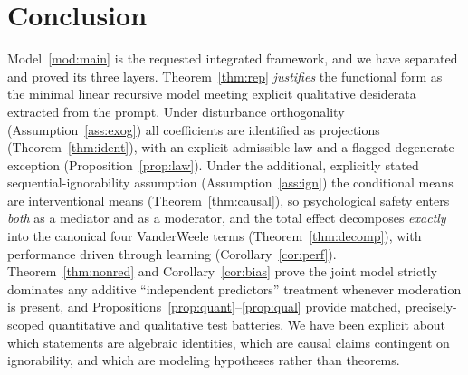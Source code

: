 \documentclass{amsart}
\theoremstyle{definition}
\theoremstyle{plain}
\begin{document}
\section{Conclusion}

Model~\ref{mod:main} is the requested integrated framework, and we have separated and proved
its three layers. Theorem~\ref{thm:rep} \emph{justifies} the functional form as the minimal
linear recursive model meeting explicit qualitative desiderata extracted from the prompt.
Under disturbance orthogonality (Assumption~\ref{ass:exog}) all coefficients are identified
as projections (Theorem~\ref{thm:ident}), with an explicit admissible law and a flagged
degenerate exception (Proposition~\ref{prop:law}). Under the additional, explicitly stated
sequential-ignorability assumption (Assumption~\ref{ass:ign}) the conditional means are
interventional means (Theorem~\ref{thm:causal}), so psychological safety enters \emph{both}
as a mediator and as a moderator, and the total effect decomposes \emph{exactly} into the
canonical four VanderWeele terms (Theorem~\ref{thm:decomp}), with performance driven through
learning (Corollary~\ref{cor:perf}). Theorem~\ref{thm:nonred} and Corollary~\ref{cor:bias}
prove the joint model strictly dominates any additive ``independent predictors'' treatment
whenever moderation is present, and Propositions~\ref{prop:quant}--\ref{prop:qual} provide
matched, precisely-scoped quantitative and qualitative test batteries. We have been explicit
about which statements are algebraic identities, which are causal claims contingent on
ignorability, and which are modeling hypotheses rather than theorems.
\end{document}
